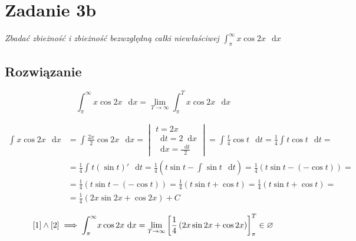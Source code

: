 \documentclass{article}
\newcommand{\diff}{\mathop{}\!\mathrm{d}}
\newcommand{\Integral}[4]{\int_{#1}^{#2} \! #3 \, \mathop{}\!\mathrm{d}#4}
\DeclareMathOperator{\?}{?}
\begin{document}
\section*{Zadanie 3b}

\textit{Zbadać zbieżność i zbieżność bezwzględną całki niewłaściwej $\displaystyle \Integral{\pi}{\infty}{x \cos{2x}}{x}$}

\subsection*{Rozwiązanie}

\setcounter{equation}{0}

\begin{equation} \label{1}
   \Integral{\pi}{\infty}{x \cos{2x}}{x} = \lim_{T \to \infty} \Integral{\pi}{T}{x \cos{2x}}{x}
\end{equation}

\begin{equation} \label{2}
   \begin{aligned}
      \Integral{}{}{x \cos{2x}}{x} &=
      \Integral{}{}{\frac{2x}{2} \cos{2x}}{x} =
      \begin{vmatrix}
         t = 2x \\[6pt]
         \diff{t} = 2 \diff{x} \\[6pt]
         \displaystyle \diff{x} = \frac{\diff{t}}{2}
      \end{vmatrix} =
      \Integral{}{}{\frac{t}{4} \cos{t}}{t} = \frac{1}{4}\Integral{}{}{t \cos{t}}{t} = \\
      &= \frac{1}{4}\Integral{}{}{t (\sin{t})'}{t} =
      \frac{1}{4}\left( t\sin{t} - \Integral{}{}{\sin{t}}{t} \right) =
      \frac{1}{4}\left( t\sin{t} - (-\cos{t}) \right) = \\
      &= \frac{1}{4}\left( t\sin{t} - (-\cos{t}) \right) = \frac{1}{4}\left( t\sin{t} + \cos{t} \right) =
      \frac{1}{4}\left( t\sin{t} + \cos{t} \right) =\\
      &= \frac{1}{4}\left( 2x\sin{2x} + \cos{2x} \right) + C
   \end{aligned}
\end{equation}

\begin{equation}
   \ref{1} \land \ref{2} \implies \Integral{\pi}{\infty}{x \cos{2x}}{x} =
   \lim_{T \to \infty} \left[ \frac{1}{4}\left( 2x\sin{2x} + \cos{2x} \right) \right]_\pi^{T}
   \in \varnothing
\end{equation}

\begin{figure}[h!]
   \centering
\end{figure}
\end{document}
